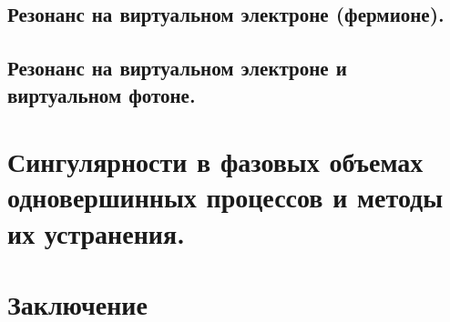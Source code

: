 \documentclass[12pt]{article}
\begin{document}
\subsection{Резонанс на виртуальном электроне (фермионе).}


\subsection{Резонанс на виртуальном электроне и виртуальном фотоне.}


\section{Сингулярности в фазовых объемах одновершинных процессов и методы их устранения.}
	
\section{Заключение}

\newpage
{}
%


\end{document}
